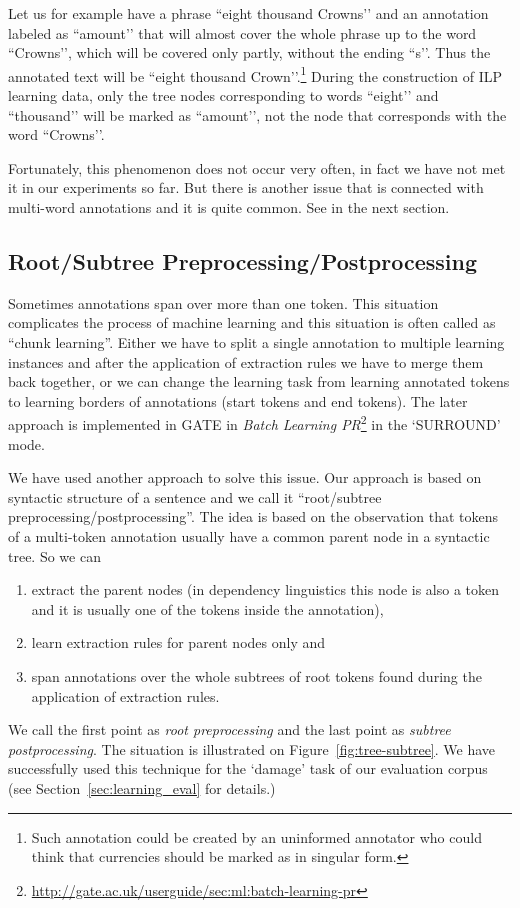 Let us for example have a phrase ``eight thousand Crowns’’ and an annotation labeled as ``amount’’ that will almost cover the whole phrase up to the word ``Crowns’’, which will be covered only partly, without the ending ``s’’. Thus the annotated text will be ``eight thousand Crown’’.\footnote{Such annotation could be created by an uninformed annotator who could think that currencies should be marked as in singular form.} During the construction of ILP learning data, only the tree nodes corresponding to words ``eight’’ and ``thousand’’ will be marked as ``amount’’, not the node that corresponds with the word ``Crowns’’.

Fortunately, this phenomenon does not occur very often, in fact we have not met it in our experiments so far. But there is another issue that is connected with multi-word annotations and it is quite common. See in the next section.


\subsection{Root/Subtree Preprocessing/Postprocessing}
Sometimes annotations span over more than one token. This situation complicates the process of machine learning and this situation is often called as ``chunk learning''. Either we have to split a single annotation to multiple learning instances and after the application of extraction rules we have to merge them back together, or we can change the learning task from learning annotated tokens to learning borders of annotations (start tokens and end tokens). The later approach is implemented in GATE in \emph{Batch Learning PR}\footnote{\url{http://gate.ac.uk/userguide/sec:ml:batch-learning-pr}} in the `SURROUND' mode.

We have used another approach to solve this issue. Our approach is based on syntactic structure of a sentence and we call it ``root/subtree preprocessing/postprocessing''. The idea is based on the observation that tokens of a multi-token annotation usually have a common parent node in a syntactic tree. So we can
\begin{enumerate}
	\item extract the parent nodes (in dependency linguistics this node is also a token and it is usually one of the tokens inside the annotation), 
	\item learn extraction rules for parent nodes only and 
	\item span annotations over the whole subtrees of root tokens found during the application of extraction rules.
\end{enumerate}
We call the first point as \emph{root preprocessing} and the last point as \emph{subtree postprocessing}. The situation is illustrated on Figure~\ref{fig:tree-subtree}. We have successfully used this technique for the `damage' task of our evaluation corpus (see Section~\ref{sec:learning_eval} for details.)

